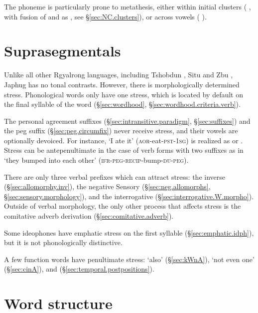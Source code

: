 The phoneme  is particularly prone to metathesis, either within initial clusters ( \fl{} , with fusion of  and  as , see §\ref{sec:NC.clusters}), or across vowels ( \fl{} ).


\section{Suprasegmentals} \label{sec:stress}
Unlike all other Rgyalrong languages, including Tshobdun \citep{jackson05yingao}, Situ \citep{linyj12tone} and Zbu  \citep{gong18these}, Japhug has no tonal contrasts. However, there is morphologically determined stress. Phonological words only have one stress, which is located by default on the final syllable of the word (§\ref{sec:wordhood}, §\ref{sec:wordhood.criteria.verb}). 

The personal agreement suffixes (§\ref{sec:intransitive.paradigm}, §\ref{sec:suffixes}) and the peg suffix  (§\ref{sec:peg.circumfix}) never receive stress, and their vowels are optionally devoiced. For instance,  `I ate it' (\textsc{aor}-eat-\textsc{pst}-\textsc{1sg}) is realized as  or . Stress can be antepenultimate in the case of verb forms with two suffixes as in  `they bumped into each other' (\textsc{ifr}-\textsc{peg}-\textsc{recip}-bump-\textsc{du}-\textsc{peg}).

There are only three verbal prefixes which can attract stress: the inverse  (§\ref{sec:allomorphy.inv}), the negative Sensory  (§\ref{sec:neg.allomorphs}, §\ref{sec:sensory.morphology}), and the interrogative  (§\ref{sec:interrogative.W.morpho}). Outside of verbal morphology, the only other process that affects stress is the comitative adverb derivation (§\ref{sec:comitative.adverb}).

Some ideophones have emphatic stress on the first syllable (§\ref{sec:emphatic.idph}), but it is not phonologically distinctive.

A few function words have penultimate stress:  `also' (§\ref{sec:kWnA}),  `not even one' (§\ref{sec:cinA}),  and  (§\ref{sec:temporal.postpositions}). 

\section{Word structure}  

